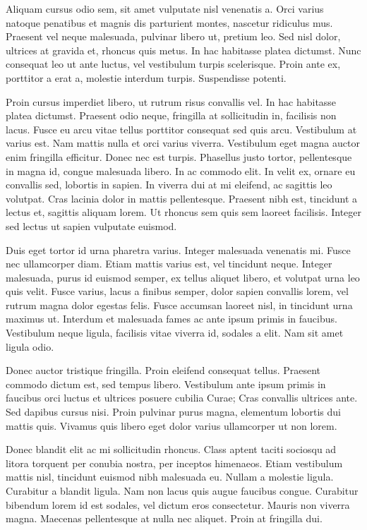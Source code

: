 \documentclass{novel}
\begin{document}
Aliquam cursus odio sem, sit amet vulputate nisl venenatis a. Orci varius natoque penatibus et magnis dis parturient montes, nascetur ridiculus mus. Praesent vel neque malesuada, pulvinar libero ut, pretium leo. Sed nisl dolor, ultrices at gravida et, rhoncus quis metus. In hac habitasse platea dictumst. Nunc consequat leo ut ante luctus, vel vestibulum turpis scelerisque. Proin ante ex, porttitor a erat a, molestie interdum turpis. Suspendisse potenti.

Proin cursus imperdiet libero, ut rutrum risus convallis vel. In hac habitasse platea dictumst. Praesent odio neque, fringilla at sollicitudin in, facilisis non lacus. Fusce eu arcu vitae tellus porttitor consequat sed quis arcu. Vestibulum at varius est. Nam mattis nulla et orci varius viverra. Vestibulum eget magna auctor enim fringilla efficitur. Donec nec est turpis. Phasellus justo tortor, pellentesque in magna id, congue malesuada libero. In ac commodo elit. In velit ex, ornare eu convallis sed, lobortis in sapien. In viverra dui at mi eleifend, ac sagittis leo volutpat. Cras lacinia dolor in mattis pellentesque. Praesent nibh est, tincidunt a lectus et, sagittis aliquam lorem. Ut rhoncus sem quis sem laoreet facilisis. Integer sed lectus ut sapien vulputate euismod.

Duis eget tortor id urna pharetra varius. Integer malesuada venenatis mi. Fusce nec ullamcorper diam. Etiam mattis varius est, vel tincidunt neque. Integer malesuada, purus id euismod semper, ex tellus aliquet libero, et volutpat urna leo quis velit. Fusce varius, lacus a finibus semper, dolor sapien convallis lorem, vel rutrum magna dolor egestas felis. Fusce accumsan laoreet nisl, in tincidunt urna maximus ut. Interdum et malesuada fames ac ante ipsum primis in faucibus. Vestibulum neque ligula, facilisis vitae viverra id, sodales a elit. Nam sit amet ligula odio.

Donec auctor tristique fringilla. Proin eleifend consequat tellus. Praesent commodo dictum est, sed tempus libero. Vestibulum ante ipsum primis in faucibus orci luctus et ultrices posuere cubilia Curae; Cras convallis ultrices ante. Sed dapibus cursus nisi. Proin pulvinar purus magna, elementum lobortis dui mattis quis. Vivamus quis libero eget dolor varius ullamcorper ut non lorem.

Donec blandit elit ac mi sollicitudin rhoncus. Class aptent taciti sociosqu ad litora torquent per conubia nostra, per inceptos himenaeos. Etiam vestibulum mattis nisl, tincidunt euismod nibh malesuada eu. Nullam a molestie ligula. Curabitur a blandit ligula. Nam non lacus quis augue faucibus congue. Curabitur bibendum lorem id est sodales, vel dictum eros consectetur. Mauris non viverra magna. Maecenas pellentesque at nulla nec aliquet. Proin at fringilla dui.
\end{document}

